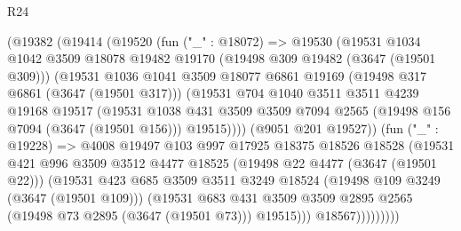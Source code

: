 \begin{lexlean}{R24}
\begin{coremodule}
              (@19382
                (@19414
                  (@19520
                    (fun ("_" : @18072) =>
                    @19530
                      (@19531
                        @1034
                        @1042
                        @3509
                        @18078
                        @19482
                        @19170
                        (@19498 @309 @19482 (@3647 (@19501 @309)))
                        (@19531
                          @1036
                          @1041
                          @3509
                          @18077
                          @6861
                          @19169
                          (@19498 @317 @6861 (@3647 (@19501 @317)))
                          (@19531
                            @704
                            @1040
                            @3511
                            @3511
                            @4239
                            @19168
                            @19517
                            (@19531
                              @1038
                              @431
                              @3509
                              @3509
                              @7094
                              @2565
                              (@19498 @156 @7094 (@3647 (@19501 @156)))
                              @19515))))
                      (@9051 @201 @19527))
                    (fun ("_" : @19228) =>
                    @4008
                      @19497
                      @103
                      @997
                      @17925
                      @18375
                      @18526
                      @18528
                      (@19531
                        @421
                        @996
                        @3509
                        @3512
                        @4477
                        @18525
                        (@19498 @22 @4477 (@3647 (@19501 @22)))
                        (@19531
                          @423
                          @685
                          @3509
                          @3511
                          @3249
                          @18524
                          (@19498 @109 @3249 (@3647 (@19501 @109)))
                          (@19531
                            @683
                            @431
                            @3509
                            @3509
                            @2895
                            @2565
                            (@19498 @73 @2895 (@3647 (@19501 @73)))
                            @19515)))
                      @18567)))))))))

\end{coremodule}
\end{lexlean}
